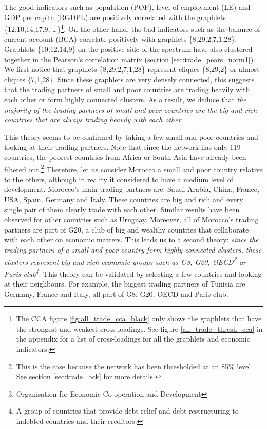The good indicators such as population (POP), level of employment (LE) and GDP per capita (RGDPL) are positively correlated with the graphlets \{12,10,14,17,9, \dots \}\footnote{The CCA figure \ref{fig:all_trade_cca_black} only shows the graphlets that have the strongest and weakest cross-loadings. See figure \ref{all_trade_thresh_cca} in the appendix for a list of cross-loadings for all the graphlets and economic indicators.}. On the other hand, the bad indicators such as the balance of current account (BCA) correlate positively with graphlets \{8,29,2,7,1,28\}. Graphlets \{10,12,14,9\} on the positive side of the spectrum have also clustered together in the Pearson's correlation matrix (section \ref{sec:trade_pears_norm1}). We first notice that graphlets \{8,29,2,7,1,28\} represent cliques \{8,29,2\} or almost cliques \{7,1,28\}. Since these graphlets are very densely connected, this suggests that the trading partners of small and poor countries are trading heavily with each other or form highly connected 
clusters. As a result, we deduce that \emph{the majority of the trading partners of small and poor countries are the big and rich countries that are always trading heavily with each other}. 

This theory seems to be confirmed by taking a few small and poor countries and looking at their trading partners. Note that since the network has only 119 countries, the poorest countries from Africa or South Asia have already been filtered out.\footnote{This is the case because the network has been thresholded at an 85\% level. See section \ref{sec:trade_bck} for more details.} Therefore, let us consider Morocco a small and poor country relative to the others, although in reality it considered to have a medium level of development. Morocco's main trading partners are: Saudi Arabia, China, France, USA, Spain, Germany and Italy. These countries are big and rich and every single pair of them clearly trade with each other. Similar results have been observed for other countries such as Uruguay. Moreover, all of Morocco's trading partners are part of G20, a club of big and wealthy countries that collaborate with each other on economic matters. This leads us to a second theory: \emph{since the trading 
partners of a small and poor country form highly connected clusters, these clusters represent big and rich economic groups such as G8, G20, OECD\footnote{Organisation for Economic Co-operation and Development} or Paris-club\footnote{A group of countries that provide debt relief and debt restructuring to indebted countries and their creditors.}}. This theory can be validated by selecting a few countries and looking at their neighbours. For example, the biggest trading partners of Tunisia are Germany, France and Italy, all part of G8, G20, OECD and Paris-club. 


